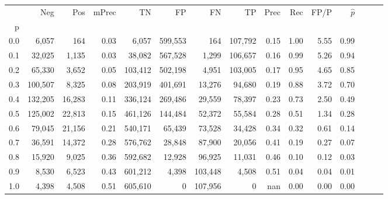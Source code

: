 \begin{tabular}{rrrrrrrrrrrrrrr}
\toprule
{} &      Neg &     Pos & mPrec &       TN &       FP &       FN &       TP &  Prec &   Rec &  FP/P & $\hat{p}$ \\
p   &          &         &       &          &          &          &          &       &       &       &           \\
\midrule
0.0 &    6,057 &     164 &  0.03 &    6,057 &  599,553 &      164 &  107,792 &  0.15 &  1.00 &  5.55 &      0.99 \\
0.1 &   32,025 &   1,135 &  0.03 &   38,082 &  567,528 &    1,299 &  106,657 &  0.16 &  0.99 &  5.26 &      0.94 \\
0.2 &   65,330 &   3,652 &  0.05 &  103,412 &  502,198 &    4,951 &  103,005 &  0.17 &  0.95 &  4.65 &      0.85 \\
0.3 &  100,507 &   8,325 &  0.08 &  203,919 &  401,691 &   13,276 &   94,680 &  0.19 &  0.88 &  3.72 &      0.70 \\
0.4 &  132,205 &  16,283 &  0.11 &  336,124 &  269,486 &   29,559 &   78,397 &  0.23 &  0.73 &  2.50 &      0.49 \\
0.5 &  125,002 &  22,813 &  0.15 &  461,126 &  144,484 &   52,372 &   55,584 &  0.28 &  0.51 &  1.34 &      0.28 \\
0.6 &   79,045 &  21,156 &  0.21 &  540,171 &   65,439 &   73,528 &   34,428 &  0.34 &  0.32 &  0.61 &      0.14 \\
0.7 &   36,591 &  14,372 &  0.28 &  576,762 &   28,848 &   87,900 &   20,056 &  0.41 &  0.19 &  0.27 &      0.07 \\
0.8 &   15,920 &   9,025 &  0.36 &  592,682 &   12,928 &   96,925 &   11,031 &  0.46 &  0.10 &  0.12 &      0.03 \\
0.9 &    8,530 &   6,523 &  0.43 &  601,212 &    4,398 &  103,448 &    4,508 &  0.51 &  0.04 &  0.04 &      0.01 \\
1.0 &    4,398 &   4,508 &  0.51 &  605,610 &        0 &  107,956 &        0 &   nan &  0.00 &  0.00 &      0.00 \\
\bottomrule
\end{tabular}
